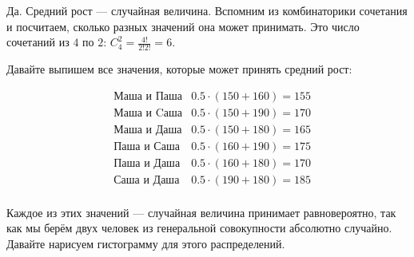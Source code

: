 \documentclass[12pt, a4paper, oneside]{article}
\begin{document}
\begin{sol}
Да. Средний рост --- случайная величина. Вспомним из комбинаторики сочетания и посчитаем, сколько разных значений она может принимать. Это число сочетаний из $4$ по $2$:  $C_4^2 = \frac{4!}{2!2!} =  6$.

Давайте выпишем все значения, которые может принять средний рост: 

\begin{equation*}
\begin{aligned}
& \text{Маша и Паша}  & 0.5 \cdot (150 + 160) = 155 \\
& \text{Маша и Cаша}  & 0.5 \cdot (150 + 190) = 170 \\
& \text{Маша и Даша}  & 0.5 \cdot (150 + 180) = 165 \\
& \text{Паша и Саша}  & 0.5 \cdot (160 + 190) = 175 \\
& \text{Паша и Даша}  & 0.5 \cdot (160 + 180) =  170 \\
& \text{Саша и Даша}  & 0.5 \cdot (190 + 180) =  185 \\
\end{aligned} 
\end{equation*}

Каждое из этих значений --- случайная величина принимает равновероятно, так как мы берём двух человек из генеральной совокупности абсолютно случайно.  Давайте нарисуем гистограмму для этого распределений. 


\end{sol}
\end{document}

